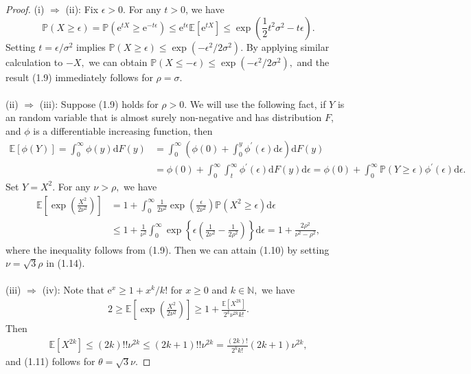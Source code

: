 \documentclass{article}
\newcommand{\E}{\mathbb{E}}
\begin{document}
\begin{proof}
(i) $\Rightarrow$ (ii): Fix $\epsilon > 0.$ For any $t>0$, we have
\begin{equation*}
	\mathbb{P}(X\geq \epsilon) = \mathbb{P}\left(\mathrm{e}^{tX}\geq \mathrm{e}^{-t\epsilon}\right)\leq \mathrm{e}^{t\epsilon}\E[\mathrm{e}^{tX}]\leq \exp\left(\frac{1}{2}t^2\sigma^2 - t\epsilon\right).\tag{1.12}
\end{equation*}
Setting $t=\epsilon / \sigma^2$ implies $\mathbb{P}(X\geq\epsilon)\leq\exp\left(-\epsilon^2/2\sigma^2\right).$ By applying similar calculation to $-X,$ we can obtain $\mathbb{P}(X\leq -\epsilon)\leq\exp\left(-\epsilon^2/2\sigma^2\right),$ and the result (1.9) immediately follows for $\rho = \sigma.$

\paragraph{} (ii) $\Rightarrow$ (iii): Suppose (1.9) holds for $\rho > 0.$ We will use the following fact, if $Y$ is an random variable that is almost surely non-negative and has distribution $F$, and $\phi$ is a differentiable increasing function, then
\begin{align*}
	\E[\phi(Y)] = \int_0^\infty \phi(y)\mathrm{d}F(y) &= \int_0^\infty\left(\phi(0) + \int_0^y\phi^\prime(\epsilon)\mathrm{d}\epsilon\right)\mathrm{d}F(y)\\
	&= \phi(0) + \int_0^\infty\int_t^\infty\phi^\prime(\epsilon)\mathrm{d}F(y)\mathrm{d}\epsilon = \phi(0) + \int_0^\infty \mathbb{P}(Y\geq\epsilon)\phi^\prime(\epsilon)\mathrm{d}\epsilon.\tag{1.13}
\end{align*}
Set $Y=X^2.$ For any $\nu > \rho,$ we have
\begin{align*}
\E\left[\exp\left(\frac{X^2}{2\nu^2}\right)\right] &= 1 + \int_0^\infty \frac{1}{2\nu^2}\exp\left(\frac{\epsilon}{2\nu^2}\right)\mathbb{P}(X^2\geq\epsilon)\mathrm{d}\epsilon\\
&\leq 1 + \frac{1}{\nu^2}\int_0^\infty\exp\left\{\epsilon\left(\frac{1}{2\nu^2} - \frac{1}{2\rho^2}\right)\right\}\mathrm{d}\epsilon = 1 + \frac{2\rho^2}{\nu^2-\rho^2},\tag{1.14}
\end{align*}
where the inequality follows from (1.9). Then we can attain (1.10) by setting $\nu=\sqrt{3}\rho$ in (1.14).

\paragraph{} (iii) $\Rightarrow$ (iv): Note that $\mathrm{e}^x \geq 1 + x^k/k!$ for $x\geq 0$ and $k\in\mathbb{N},$ we have
\begin{align*}
	2\geq \E\left[\exp\left(\frac{X^2}{2\nu^2}\right)\right] \geq 1 + \frac{\E[X^{2k}]}{2^k \nu^{2k}k!}.\tag{1.15}
\end{align*}
Then
\begin{align*}
	\E[X^{2k}]\leq (2k)!!\nu^{2k} \leq (2k+1)!!\nu^{2k} = \frac{(2k)!}{2^k k!}(2k+1)\nu^{2k},\tag{1.16}
\end{align*}
and (1.11) follows for $\theta=\sqrt{3}\nu.$


\end{proof}
\end{document}
